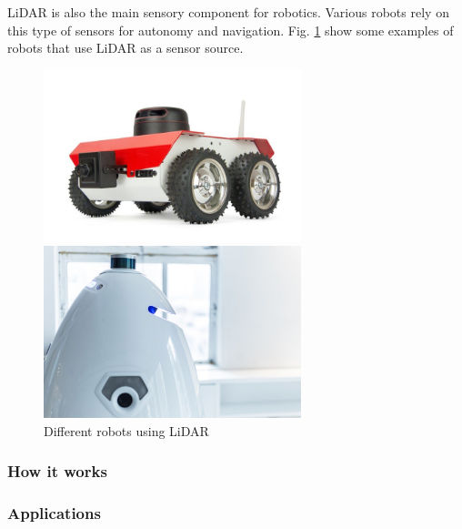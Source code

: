 \ac{LiDAR} is also the main sensory component for robotics. Various robots rely on this type of sensors for autonomy and navigation. Fig. \ref{fig:robotslidar} show some examples of robots that use \ac{LiDAR} as a sensor source.
\begin{figure}[h] 
    \begin{minipage}[b]{.49\linewidth}
        \includegraphics[height=5cm,width=\linewidth]{imgs/chapter2/robot1.jpg}
    \end{minipage}
    \begin{minipage}[b]{.49\linewidth}
        \includegraphics[height=5cm,width=\linewidth]{imgs/chapter2/robot2.jpg}
    \end{minipage}
    \caption{Different robots using \ac{LiDAR}}
    \label{fig:robotslidar}
\end{figure}



\subsubsection{How it works}

\subsubsection{Applications}
